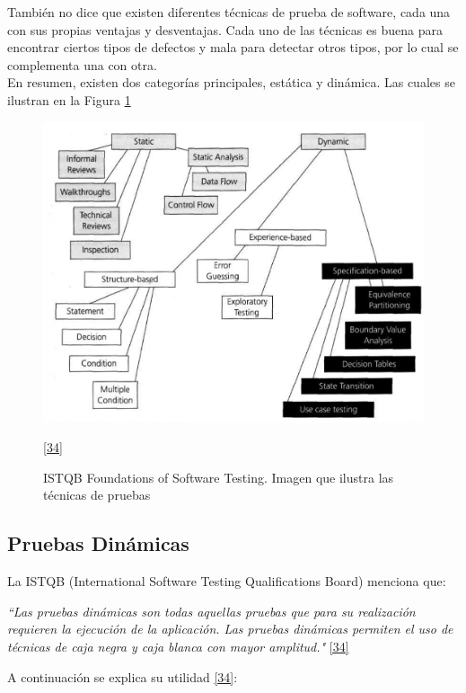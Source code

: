 También no dice que existen diferentes técnicas de prueba de software, cada una con sus propias ventajas y desventajas. Cada uno de las técnicas es buena para encontrar ciertos tipos  de defectos y mala para detectar otros tipos, por lo cual se complementa una con otra.\\

En resumen, existen dos categorías principales, estática y dinámica. Las cuales se ilustran en la Figura \ref{fig:tecnicas}
 
\begin{figure}[H]
	\begin{center}
		\includegraphics[width=.80\textwidth]{images/marcoteorico/tecnicas}
		\caption{ISTQB Foundations of Software Testing. Imagen que ilustra las técnicas de pruebas}
		\label{fig:tecnicas}
		\hyperlink{b34}{[34]}
	\end{center}
\end{figure}

\subsection{Pruebas Dinámicas}

La ISTQB (International Software Testing Qualifications Board) menciona que:

\textit {``Las pruebas dinámicas son todas aquellas pruebas que para su realización requieren la ejecución de la aplicación. Las pruebas dinámicas permiten el uso de técnicas de caja negra y caja blanca con mayor amplitud."} \hyperlink{b34}{[34]} 

A continuación se explica su utilidad \hyperlink{b34}{[34]}:  

